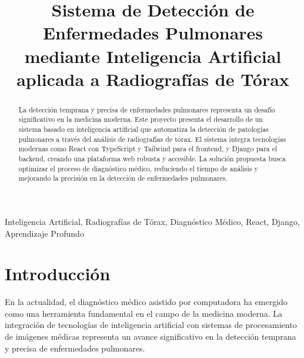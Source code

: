 \documentclass[conference]{IEEEtran}
\begin{document}
\title{Sistema de Detección de Enfermedades Pulmonares mediante Inteligencia Artificial aplicada a Radiografías de Tórax}

\author{
\and
{}
}

\maketitle

\begin{abstract}
La detección temprana y precisa de enfermedades pulmonares representa un desafío significativo en la medicina moderna. Este proyecto presenta el desarrollo de un sistema basado en inteligencia artificial que automatiza la detección de patologías pulmonares a través del análisis de radiografías de tórax. El sistema integra tecnologías modernas como React con TypeScript y Tailwind para el frontend, y Django para el backend, creando una plataforma web robusta y accesible. La solución propuesta busca optimizar el proceso de diagnóstico médico, reduciendo el tiempo de análisis y mejorando la precisión en la detección de enfermedades pulmonares.
\end{abstract}

\begin{IEEEkeywords}
Inteligencia Artificial, Radiografías de Tórax, Diagnóstico Médico, React, Django, Aprendizaje Profundo
\end{IEEEkeywords}

\section{Introducción}
En la actualidad, el diagnóstico médico asistido por computadora ha emergido como una herramienta fundamental en el campo de la medicina moderna. La integración de tecnologías de inteligencia artificial con sistemas de procesamiento de imágenes médicas representa un avance significativo en la detección temprana y precisa de enfermedades pulmonares.
\end{document}
